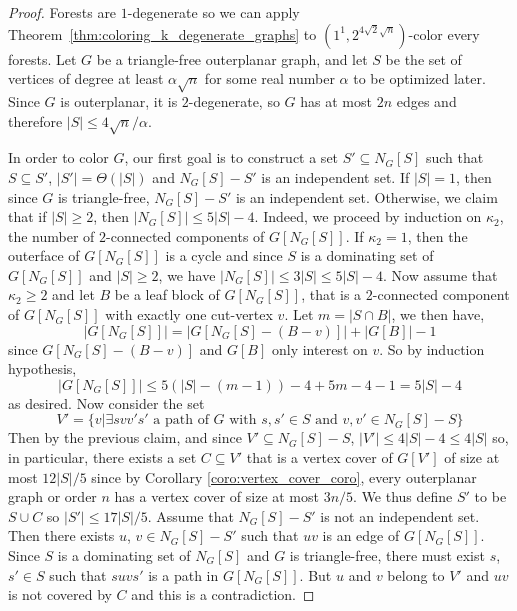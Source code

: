 \documentclass{article}
\newcommand{\colo}[2]{(1^{#1}, 2^{#2})}
\begin{document}
\begin{proof}
    Forests are $1$-degenerate so we can apply Theorem~\ref{thm:coloring_k_degenerate_graphs} to $\colo{1}{4\sqrt{2}\sqrt{n}}$-color every forests. 
    Let $G$ be a triangle-free outerplanar graph, and let $S$ be the set of vertices of degree at least $\alpha \sqrt{n}$ for some real number $\alpha$ to be optimized later. Since $G$ is outerplanar, it is $2$-degenerate, so $G$ has at most $2n$ edges and therefore $|S| \leq 4\sqrt{n}/\alpha$. 

    In order to color $G$, our first goal is to construct a set $S' \subseteq N_G[S]$ such that $S \subseteq S'$, $|S'| = \Theta(|S|)$ and $N_G[S] - S'$ is an independent set. If $|S| = 1$, then since $G$ is triangle-free, $N_G[S] - S'$ is an independent set. Otherwise, we claim that if $|S| \geq 2$, then $|N_G[S]| \le 5|S|-4$.
    Indeed, we proceed by induction on $\kappa_2$, the number of $2$-connected components of $G[N_G[S]]$. If $\kappa_2 = 1$, then the outerface of $G[N_G[S]]$ is a cycle and since $S$ is a dominating set of $G[N_G[S]]$ and $|S| \ge 2$, we have $|N_G[S]| \le 3|S| \le  5|S| - 4$. Now assume that $\kappa_2 \geq 2$ and let $B$ be a leaf block of $G[N_G[S]]$, that is a $2$-connected component of $G[N_G[S]]$ with exactly one cut-vertex $v$. Let $m = |S \cap B|$, we then have, 
        \[|G[N_G[S]]| = |G[N_G[S] - (B - v)]| + |G[B]| - 1\]
    since $G[N_G[S] - (B - v)]$ and $G[B]$ only interest on $v$. So by induction hypothesis, 
        \[|G[N_G[S]]| \le 5(|S| - (m - 1)) - 4 + 5m - 4 - 1 = 5|S| - 4\]
    as desired. Now consider the set 
    \[V' = \{v | \exists svv's' \textrm{ a path of } G \textrm{ with } s, s' \in S \textrm{ and } v, v' \in N_G[S] - S\}\]
    Then by the previous claim, and since $V' \subseteq N_G[S] - S$, $|V'| \le 4|S| - 4 \le 4|S|$ so, in particular, there exists a set $C \subseteq V'$ that is a vertex cover of $G[V']$ of size at most $12|S|/5$ since by Corollary \ref{coro:vertex_cover_coro}, every outerplanar graph or order $n$ has a vertex cover of size at most $3n/5$. We thus define $S'$ to be $S \cup C$ so $|S'| \le 17|S|/5$. Assume that $N_G[S] - S'$ is not an independent set. Then there exists $u$, $v \in N_G[S] - S'$ such that $uv$ is an edge of $G[N_G[S]]$. Since $S$ is a dominating set of $N_G[S]$ and $G$ is triangle-free, there must exist $s$, $s' \in S$ such that $suvs'$ is a path in $G[N_G[S]]$. But $u$ and $v$ belong to $V'$ and $uv$ is not covered by $C$ and this is a contradiction.


\end{proof}
\end{document}
